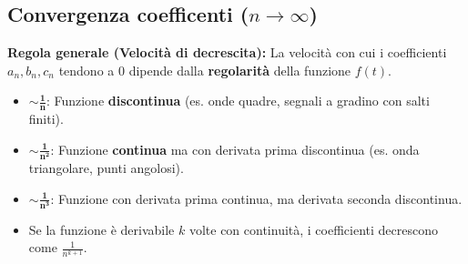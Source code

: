 \subsection[Convergenza coefficenti]{Convergenza coefficenti ($n \rightarrow \infty$)}
\textbf{Regola generale (Velocità di decrescita):} La velocità con cui i coefficienti $a_n, b_n, c_n$ tendono a $0$ dipende dalla \textbf{regolarità} della funzione $f(t)$.
\begin{itemize}
        \item $\mathbf{\sim \frac{1}{n}}$: Funzione \textbf{discontinua} (es. onde quadre, segnali a gradino con salti finiti).
        \item $\mathbf{\sim \frac{1}{n^2}}$: Funzione \textbf{continua} ma con derivata prima discontinua (es. onda triangolare, punti angolosi).
        \item $\mathbf{\sim \frac{1}{n^3}}$: Funzione con derivata prima continua, ma derivata seconda discontinua.
        \item Se la funzione è derivabile $k$ volte con continuità, i coefficienti decrescono come $\frac{1}{n^{k+1}}$.
\end{itemize}